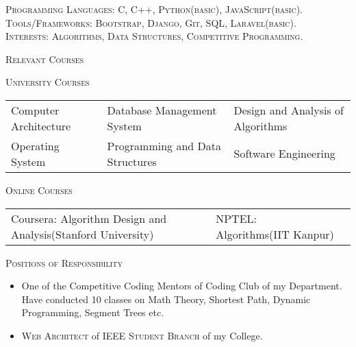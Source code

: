 \documentclass[10pt]{article}
\begin{document}
	\vspace{3mm}

	\normalsize{
	\textsc{Programming Languages:} \textsc{C, C++, Python(basic), JavaScript(basic).} \\
	\textsc{Tools/Frameworks:} \textsc{Bootstrap, Django, Git, SQL, Laravel(basic).}
	}\\
	\textsc{Interests:} \textsc{Algorithms, Data Structures, Competitive Programming.}
			
	\vspace{4mm}
		{\centering\Large{\textsc{Relevant Courses}}\hrulefill}
		
	\vspace{4mm}
	\large{\textsc{University Courses}}
	\vspace{2mm}
	\begin{small}
	
	\begin{tabular}{p{7.2cm} p{5.7cm} p{6cm}}
	{Computer Architecture} & {Database Management System} &{Design and Analysis of Algorithms}\\
	{Operating System} & {Programming and Data Structures} &	{Software Engineering}\\
	\end{tabular}
	
	\end{small}
	\vspace{2mm}
	\large{\textsc{Online Courses}}
	\vspace{2mm}
	\begin{small}
	
	\begin{tabular}{p{9.2cm} p{6.7cm} p{6cm}}
	{Coursera: Algorithm Design and Analysis(Stanford University)} & {NPTEL: Algorithms(IIT Kanpur)}
	\vspace{3mm}
	\end{tabular}
	
	\end{small}
	\vspace{4mm}
	{\centering\Large{\textsc{Positions of Responsibility}}	\hrulefill}
		
	\vspace{4mm}		
	\setlength\itemsep{-0.25em}
	\begin{small}
	\begin{itemize}

	\item One of the Competitive Coding Mentors of Coding Club of my Department. Have conducted 10 classes on Math Theory, Shortest Path, Dynamic Programming, Segment Trees etc.
	\item \textsc{Web Architect} of \textsc{IEEE Student Branch} of my College.
	\end{itemize}	
	\end{small}
\end{document}
